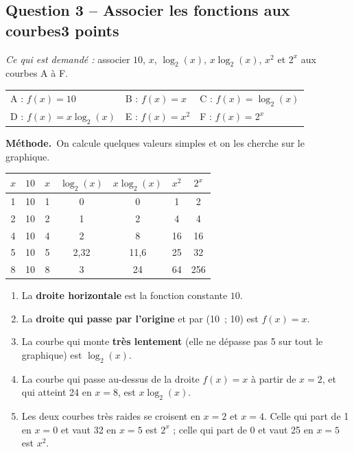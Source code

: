 \documentclass[11pt, a4paper]{exam}
\newcommand{\Qt}[2]{\subsection*{#1\hfill{\normalfont\small #2}}}
\newcommand{\rappel}[1]{\noindent\textit{Ce qui est demandé :} #1\par\smallskip}
\newcommand{\methode}{\noindent\textbf{Méthode.}\ }
\begin{document}
\Qt{Question 3 -- Associer les fonctions aux courbes}{3 points}
\rappel{associer $10$, $x$, $\log_2(x)$, $x\log_2(x)$, $x^2$ et $2^x$ aux courbes A à F.}
\begin{reponse}
\begin{tabular}{@{}lll@{}}
A : $f(x) = 10$ & B : $f(x) = x$ & C : $f(x) = \log_2(x)$ \\
D : $f(x) = x\log_2(x)$ & E : $f(x) = x^2$ & F : $f(x) = 2^x$
\end{tabular}
\end{reponse}

\methode On calcule quelques valeurs simples et on les cherche sur le graphique.
\begin{center}\small
\begin{tabular}{|c|c|c|c|c|c|c|}\hline
$x$ & $10$ & $x$ & $\log_2(x)$ & $x\log_2(x)$ & $x^2$ & $2^x$ \\\hline
1 & 10 & 1 & 0 & 0 & 1 & 2 \\
2 & 10 & 2 & 1 & 2 & 4 & 4 \\
4 & 10 & 4 & 2 & 8 & 16 & 16 \\
5 & 10 & 5 & 2,32 & 11,6 & 25 & 32 \\
8 & 10 & 8 & 3 & 24 & 64 & 256 \\\hline
\end{tabular}
\end{center}
\begin{enumerate}
\item La \textbf{droite horizontale} est la fonction constante $10$.
\item La \textbf{droite qui passe par l'origine} et par (10~; 10) est $f(x) = x$.
\item La courbe qui monte \textbf{très lentement} (elle ne dépasse pas 5 sur tout le graphique) est $\log_2(x)$.
\item La courbe qui passe au-dessus de la droite $f(x)=x$ à partir de $x = 2$, et qui atteint 24 en $x = 8$, est $x\log_2(x)$.
\item Les deux courbes très raides se croisent en $x = 2$ et $x = 4$. Celle qui part de 1 en $x = 0$ et vaut 32 en $x = 5$ est $2^x$ ; celle qui part de 0 et vaut 25 en $x = 5$ est $x^2$.
\end{enumerate}
\end{document}
